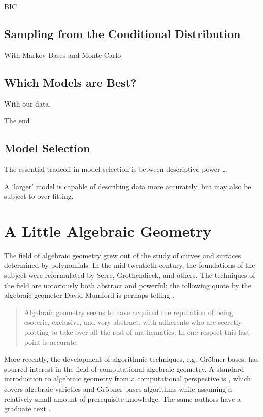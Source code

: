 \documentclass[cclicense]{hmcthesis}
\numberwithin{equation}{chapter}
\numberwithin{thmcounter}{chapter}
\begin{document}
    BIC

\section{Sampling from the Conditional Distribution}

    With Markov Bases and Monte Carlo


\section{Which Models are Best?}

    With our data.

    The end


\section{Model Selection}
    The essential tradeoff in model selection is between descriptive power \ldots

    A `larger' model is capable of describing data more accurately, but may also be
    subject to over-fitting.



\appendix


\chapter{A Little Algebraic Geometry}

    The field of algebraic geometry grew out of the study of curves and surfaces
    determined by polynomials.  In the mid-twentieth century, the foundations of
    the subject were reformulated by Serre, Grothendieck, and others.  The
    techniques of the field are notoriously both abstract and powerful; the
    following quote by the algebraic geometer David Mumford is perhaps telling
    \citep{Mum99}.
    \begin{quote}
        Algebraic geometry seems to have acquired the reputation of being
        esoteric, exclusive, and very abstract, with adherents who are secretly
        plotting to take over all the rest of mathematics.  In one respect this
        last point is accurate.
    \end{quote}
    More recently, the development of algorithmic techniques, e.g. Gröbner
    bases, has spurred interest in the field of computational algebraic
    geometry.  A standard introduction to algebraic geometry from a
    computational perspective is \citep{CLO97}, which covers algebraic varieties
    and Gröbner bases algorithms while assuming a relatively small amount of
    prerequisite knowledge.  The same authors have a graduate text \citep{CLO05}.
\end{document}
